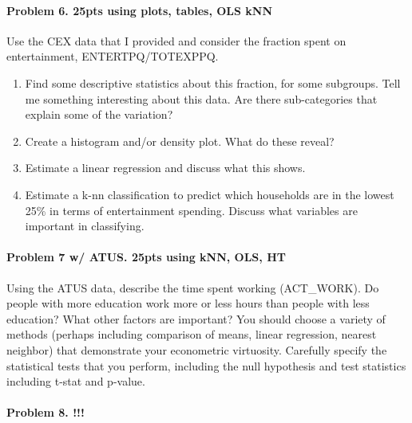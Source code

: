 \documentclass[]{article}
\providecommand{\tightlist}{%
  \setlength{\itemsep}{0pt}\setlength{\parskip}{0pt}}
\let\oldparagraph\paragraph
\renewcommand{\paragraph}[1]{\oldparagraph{#1}\mbox{}}
\begin{document}
\paragraph{Problem 6. 25pts using plots, tables, OLS
kNN}\label{problem-6.-25pts-using-plots-tables-ols-knn}

Use the CEX data that I provided and consider the fraction spent on
entertainment, ENTERTPQ/TOTEXPPQ.

\begin{enumerate}
\def\labelenumi{\alph{enumi}.}
\tightlist
\item
  Find some descriptive statistics about this fraction, for some
  subgroups. Tell me something interesting about this data. Are there
  sub-categories that explain some of the variation?
\item
  Create a histogram and/or density plot. What do these reveal?
\item
  Estimate a linear regression and discuss what this shows.
\item
  Estimate a k-nn classification to predict which households are in the
  lowest 25\% in terms of entertainment spending. Discuss what variables
  are important in classifying.
\end{enumerate}

\paragraph{Problem 7 w/ ATUS. 25pts using kNN, OLS,
HT}\label{problem-7-w-atus.-25pts-using-knn-ols-ht}

Using the ATUS data, describe the time spent working (ACT\_WORK). Do
people with more education work more or less hours than people with less
education? What other factors are important? You should choose a variety
of methods (perhaps including comparison of means, linear regression,
nearest neighbor) that demonstrate your econometric virtuosity.
Carefully specify the statistical tests that you perform, including the
null hypothesis and test statistics including t-stat and p-value.

\paragraph{Problem 8. !!!}\label{problem-8.}
\end{document}
